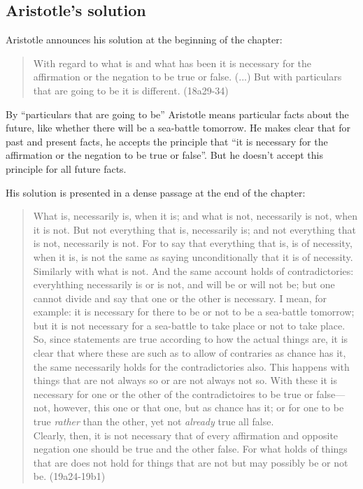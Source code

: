 \documentclass[../../../include/open-logic-section]{subfiles}
\begin{document}
\subsection{Aristotle's solution}

Aristotle announces his solution at the beginning of the chapter:

\begin{quote}
	With regard to what is and what has been it is necessary for the affirmation or the negation to be true or false. (...) But with particulars that are going to be it is different. (18a29-34)
\end{quote}

By ``particulars that are going to be'' Aristotle means particular facts about the future, like whether there will be a sea-battle tomorrow. He makes clear that for past and present facts, he accepts the principle that ``it is necessary for the affirmation or the negation to be true or false''. But he doesn't accept this principle for all future facts. 

His solution is presented in a dense passage at the end of the chapter:

\begin{quote}
	What is, necessarily is, when it is; and what is not, necessarily is not, when it is not. But not everything that is, necessarily is; and not everything that is not, necessarily is not. For to say that everything that is, is of necessity, when it is, is not the same as saying unconditionally that it is of necessity. Similarly with what is not. And the same account holds of contradictories: everyhthing necessarily is or is not, and will be or will not be; but one cannot divide and say that one or the other is necessary. I mean, for  example: it is necessary for there to be or not to be a sea-battle tomorrow; but it is not necessary for a sea-battle to take place or not to take place. So, since statements are true according to how the actual things are, it is clear that where these are such as to allow of contraries as chance has it, the same necessarily holds for the contradictories also. This happens with things that are not always so or are not always not so. With these it is necessary for one or the other of the contradictoires to be true or false---not, however, this one or that one, but as chance has it; or for one to be true \emph{rather} than the other, yet not \emph{already} true all false. \\
	Clearly, then, it is not necessary that of every affirmation and opposite negation one should be true and the other false. For what holds of things that are does not hold for things that are not but may possibly be or not be. (19a24-19b1)
\end{quote}
\end{document}
